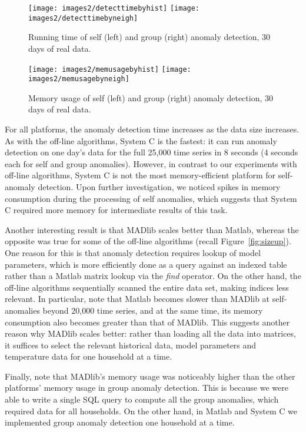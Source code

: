 \documentclass[prodmode,acmtods]{acmsmall}
\begin{document}
\begin{figure*}[t]
\centering
\texttt{[image: images2/detecttimebyhist]}
\texttt{[image: images2/detecttimebyneigh]}
   \caption{Running time of self (left) and group (right) anomaly detection, 30 days of real data.}
  \label{fig:online_runtime} 
\end{figure*}

\begin{figure*}[t]
\centering
\texttt{[image: images2/memusagebyhist]}
\texttt{[image: images2/memusagebyneigh]}
   \caption{Memory usage of self (left) and group (right) anomaly detection, 30 days of real data.}
  \label{fig:online_memory} 
\end{figure*}

For all platforms, the anomaly detection time increases as the data size increases.  As with the off-line algorithms, System C is the fastest: it can run anomaly detection on one day's data for the full 25,000 time series in 8 seconds (4 seconds each for self and group anomalies).  However, in contrast to our experiments with off-line algorithms, System C is not the most memory-efficient platform for self-anomaly detection.  Upon further investigation, we noticed spikes in memory consumption during the processing of self anomalies, which suggests that System C required more memory for intermediate results of this task.  

Another interesting result is that MADlib scales better than Matlab, whereas the opposite was true for some of the off-line algorithms (recall Figure~\ref{fig:sizeup}).  One reason for this is that anomaly detection requires lookup of model parameters, which is more efficiently done as a query against an indexed table rather than a Matlab matrix lookup via the \emph{find} operator.  On the other hand, the off-line algorithms sequentially scanned the entire data set, making indices less relevant.  In particular, note that Matlab becomes slower than MADlib at self-anomalies beyond 20,000 time series, and at the same time, its memory consumption also becomes greater than that of MADlib.  This suggests another reason why MADlib scales better: rather than loading all the data into matrices, it suffices to select the relevant historical data, model parameters and temperature data for one household at a time.

Finally, note that MADlib's memory usage was noticeably higher than the other platforms' memory usage in group anomaly detection.  This is because we were able to write a single SQL query to compute all the group anomalies, which required data for all households.  On the other hand, in Matlab and System C we implemented group anomaly detection one household at a time.
\end{document}
